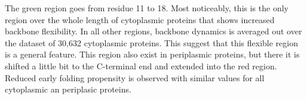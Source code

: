 The green region goes from residue 11 to 18.
Most noticeably, this is the only region over the whole length of cytoplasmic proteins that shows increased backbone flexibility.
In all other regions, backbone dynamics is averaged out over the dataset of 30,632 cytoplasmic proteins.
This suggest that this flexible region is a general feature.
This region also exist in periplasmic proteins, 
but there it is shifted a little bit to the C-terminal end and extended into the red region.
Reduced early folding propensity is observed with similar values for all cytoplasmic an periplasic proteins.
